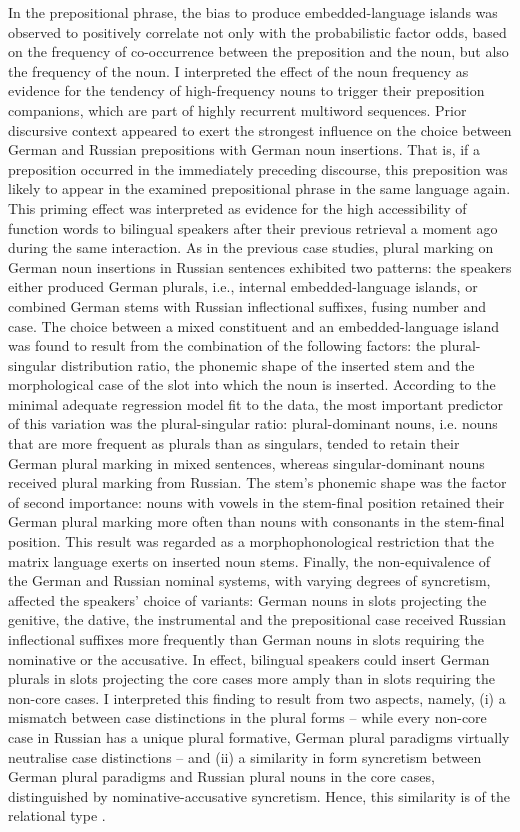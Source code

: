 In the prepositional phrase, the bias to produce embedded-language islands was observed to positively correlate not only with the probabilistic factor odds, based on the frequency of co-occurrence between the preposition and the noun, but also the frequency of the noun. I interpreted the effect of the noun frequency as evidence for the tendency of high-frequency nouns to trigger their preposition companions, which are part of highly recurrent multiword sequences. Prior discursive context appeared to exert the strongest influence on the choice between German and Russian prepositions with German noun insertions. That is, if a preposition occurred in the immediately preceding discourse, this preposition was likely to appear in the examined prepositional phrase in the same language again. This priming effect was interpreted as evidence for the high accessibility of function words to bilingual speakers after their previous retrieval a moment ago during the same interaction.
As in the previous case studies, plural marking on German noun insertions in Russian sentences exhibited two patterns: the speakers either produced German plurals, i.e., internal embedded-language islands, or combined German stems with Russian inflectional suffixes, fusing number and case. The choice between a mixed constituent and an embedded-language island was found to result from the combination of the following factors: the plural-singular distribution ratio, the phonemic shape of the inserted stem and the morphological case of the slot into which the noun is inserted. According to the minimal adequate regression model fit to the data, the most important predictor of this variation was the plural-singular ratio: plural-dominant nouns, i.e. nouns that are more frequent as plurals than as singulars, tended to retain their German plural marking in mixed sentences, whereas singular-dominant nouns received plural marking from Russian. The stem's phonemic shape was the factor of second importance: nouns with vowels in the stem-final position retained their German plural marking more often than nouns with consonants in the stem-final position. This result was regarded as a morphophonological restriction that the matrix language exerts on inserted noun stems. Finally, the non-equivalence of the German and Russian nominal systems, with varying degrees of syncretism, affected the speakers' choice of variants: German nouns in slots projecting the genitive, the dative, the instrumental and the prepositional case received Russian inflectional suffixes more frequently than German nouns in slots requiring the nominative or the accusative. In effect, bilingual speakers could insert German plurals in slots projecting the core cases more amply than in slots requiring the non-core cases. I interpreted this finding to result from two aspects, namely, (i) a mismatch between case distinctions in the plural forms -- while every non-core case in Russian has a unique plural formative, German plural paradigms virtually neutralise case distinctions -- and (ii) a similarity in form syncretism between German plural paradigms and Russian plural nouns in the core cases, distinguished by nominative-accusative syncretism. Hence, this similarity is of the relational type \citep{gentner-markmann1997}.

